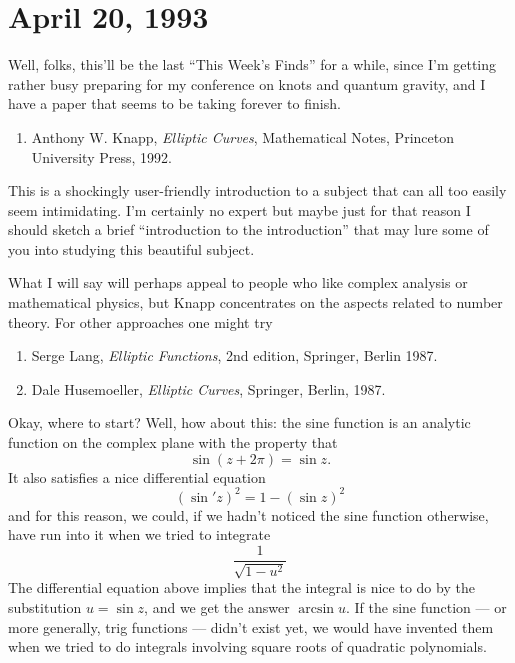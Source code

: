 \documentclass{article}
\def\tightlist{}
\begin{document}
\hypertarget{week13}{%
\section{April 20, 1993}\label{week13}}

Well, folks, this'll be the last ``This Week's Finds'' for a while,
since I'm getting rather busy preparing for my conference on knots and
quantum gravity, and I have a paper that seems to be taking forever to
finish.

\begin{enumerate}
\def\labelenumi{\arabic{enumi})}
\tightlist
\item
  Anthony W. Knapp, \emph{Elliptic Curves}, Mathematical Notes,
  Princeton University Press, 1992.
\end{enumerate}

This is a shockingly user-friendly introduction to a subject that can
all too easily seem intimidating. I'm certainly no expert but maybe just
for that reason I should sketch a brief ``introduction to the
introduction'' that may lure some of you into studying this beautiful
subject.

What I will say will perhaps appeal to people who like complex analysis
or mathematical physics, but Knapp concentrates on the aspects related
to number theory. For other approaches one might try

\begin{enumerate}
\def\labelenumi{\arabic{enumi})}
\setcounter{enumi}{1}
\item
  Serge Lang, \emph{Elliptic Functions}, 2nd edition, Springer, Berlin
  1987.
\item
  Dale Husemoeller, \emph{Elliptic Curves}, Springer, Berlin, 1987.
\end{enumerate}

Okay, where to start? Well, how about this: the sine function is an
analytic function on the complex plane with the property that
\[\sin(z + 2\pi) = \sin z.\] It also satisfies a nice differential
equation \[(\sin' z)^2 = 1 -(\sin z)^2\] and for this reason, we could,
if we hadn't noticed the sine function otherwise, have run into it when
we tried to integrate
 \[\frac{1}{\sqrt{1 -u^2}}\] 
The differential equation above implies that the integral is nice to do by the
substitution \(u = \sin z\), and we get the answer \(\arcsin u\). If the
sine function --- or more generally, trig functions --- didn't exist
yet, we would have invented them when we tried to do integrals involving
square roots of quadratic polynomials.
\end{document}
